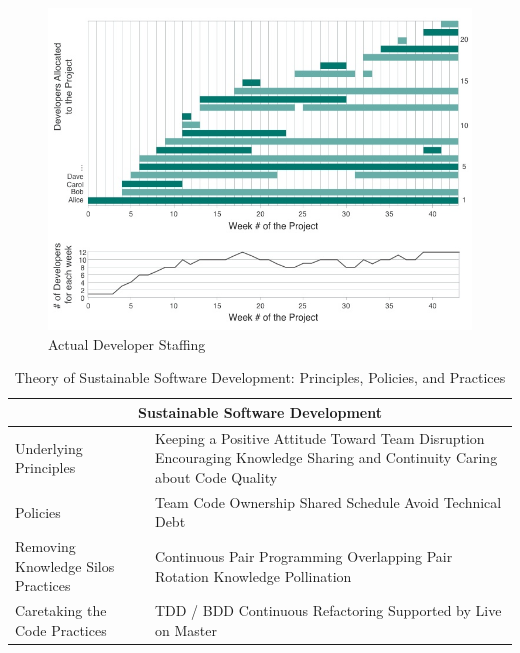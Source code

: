 \begin{figure}[t]
\centering
\includegraphics[width=\twoColumnWidth{}]{sustainable_software_development_images/DeveloperStaffingV4.jpg}
\caption{Actual Developer Staffing}
\label{DeveloperStaffing}
\end{figure}

\begin{table}[t]
\renewcommand{\arraystretch}{1.5}
\centering
\caption{Theory of Sustainable Software Development: Principles, Policies, and Practices}
\label{SustainableSoftwareDevelopmentTable}
\begin{tabular}{|p{2.5in}|p{3.5in}|}
\hline
\multicolumn{2}{|c|}{Sustainable Software Development}              
\\
\hline
Underlying Principles & Keeping a Positive Attitude Toward Team Disruption \newline Encouraging Knowledge Sharing and Continuity \newline Caring about Code Quality \\ 
\hline
Policies & Team Code Ownership \newline Shared Schedule \newline Avoid Technical Debt  \\
\hline
Removing Knowledge Silos Practices & Continuous Pair Programming \newline Overlapping Pair Rotation \newline  Knowledge Pollination  \\
\hline
Caretaking the Code Practices & TDD / BDD \newline Continuous Refactoring  \newline Supported by Live on Master \\
\hline
\end{tabular}
\end{table}


